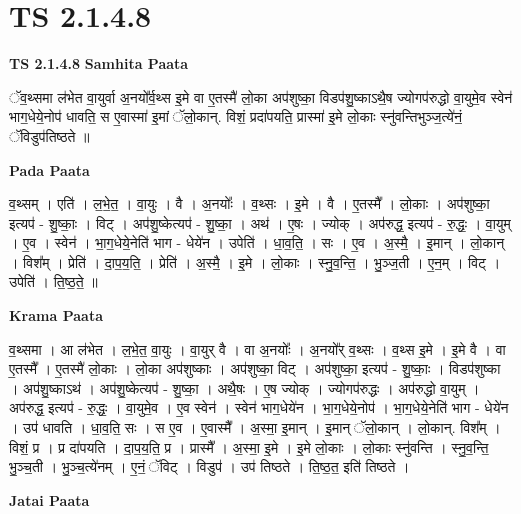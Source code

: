 \documentclass[17pt]{extarticle}
\begin{document}
\section*{ TS 2.1.4.8 }

\textbf{TS 2.1.4.8 } \newline
\textbf{Samhita Paata} \newline

ॅव॒थ्समा ल॑भेत वा॒युर्वा अ॒नयो᳚र्व॒थ्स इ॒मे वा ए॒तस्मै॑ लो॒का अप॑शुष्का॒ विडप॑शु॒ष्काऽथै॒ष ज्योगप॑रुद्धो वा॒युमे॒व स्वेन॑ भाग॒धेये॒नोप॑ धावति॒ स ए॒वास्मा॑ इ॒मां ॅलो॒कान्. विशं॒ प्रदा॑पयति॒ प्रास्मा॑ इ॒मे लो॒काः स्नु॑वन्तिभुञ्ज॒त्ये॑नं॒ ॅविडुप॑तिष्ठते ॥ \newline

\textbf{Pada Paata} \newline

व॒थ्सम् । एति॑ । ल॒भे॒त॒ । वा॒युः । वै । अ॒नयोः᳚ । व॒थ्सः । इ॒मे । वै । ए॒तस्मै᳚ । लो॒काः । अप॑शुष्का॒ इत्यप॑ - शु॒ष्काः॒ । विट् । अप॑शु॒ष्केत्यप॑ - शु॒ष्का॒ । अथ॑ । ए॒षः । ज्योक् । अप॑रुद्ध॒ इत्यप॑ - रु॒द्धः॒ । वा॒युम् । ए॒व । स्वेन॑ । भा॒ग॒धेये॒नेति॑ भाग - धेये॑न । उपेति॑ । धा॒व॒ति॒ । सः । ए॒व । अ॒स्मै॒ । इ॒मान् । लो॒कान् । विश᳚म् । प्रेति॑ । दा॒प॒य॒ति॒ । प्रेति॑ । अ॒स्मै॒ । इ॒मे । लो॒काः । स्नु॒व॒न्ति॒ । भु॒ञ्ज॒ती । ए॒न॒म् । विट् । उपेति॑ । ति॒ष्ठ॒ते॒ ॥  \newline


\textbf{Krama Paata} \newline

व॒थ्समा । आ ल॑भेत । ल॒भे॒त॒ वा॒युः । वा॒युर् वै । वा अ॒नयोः᳚ । अ॒नयो᳚र् व॒थ्सः । व॒थ्स इ॒मे । इ॒मे वै । वा ए॒तस्मै᳚ । ए॒तस्मै॑ लो॒काः । लो॒का अप॑शुष्काः । अप॑शुष्का॒ विट् । अप॑शुष्का॒ इत्यप॑ - शु॒ष्काः॒ । विडप॑शुष्का । अप॑शु॒ष्काऽथ॑ । अप॑शु॒ष्केत्यप॑ - शु॒ष्का॒ । अथै॒षः । ए॒ष ज्योक् । ज्योगप॑रुद्धः । अप॑रुद्धो वा॒युम् । अप॑रुद्ध॒ इत्यप॑ - रु॒द्धः॒ । वा॒युमे॒व । ए॒व स्वेन॑ । स्वेन॑ भाग॒धेये॑न । भा॒ग॒धेये॒नोप॑ । भा॒ग॒धेये॒नेति॑ भाग - धेये॑न । उप॑ धावति । धा॒व॒ति॒ सः । स ए॒व । ए॒वास्मै᳚ । अ॒स्मा॒ इ॒मान् । इ॒मान् ॅलो॒कान् । लो॒कान्. विश᳚म् । विशं॒ प्र । प्र दा॑पयति । दा॒प॒य॒ति॒ प्र । प्रास्मै᳚ । अ॒स्मा॒ इ॒मे । इ॒मे लो॒काः । लो॒काः स्नु॑वन्ति । स्नु॒व॒न्ति॒ भु॒ञ्च॒ती । भु॒ञ्च॒त्ये॑नम् । ए॒नं॒ ॅविट् । विडुप॑ । उप॑ तिष्ठते । ति॒ष्ठ॒त॒ इति॑ तिष्ठते । \newline

\textbf{Jatai Paata} \newline
\end{document}
